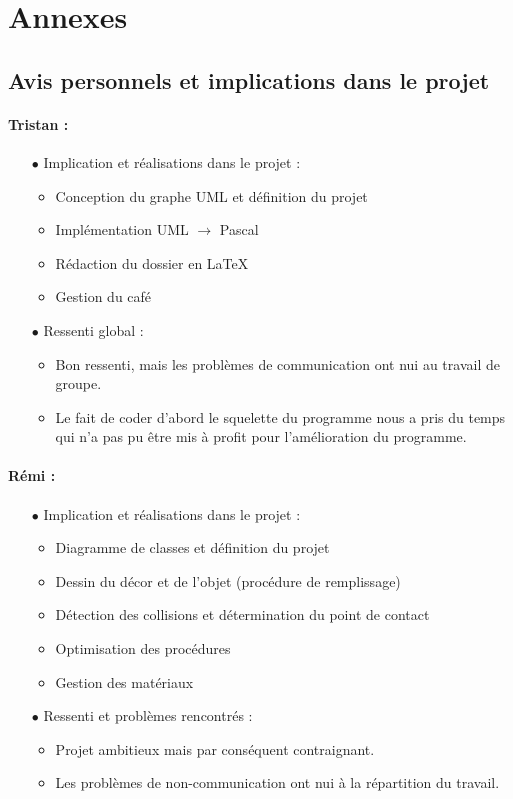 \section{Annexes}
\subsection{Avis personnels et implications dans le projet}
\paragraph{Tristan :}
\begin{itemize}

\item[$\bullet$]  Implication et réalisations dans le projet :
\begin{itemize}
\item Conception du graphe UML et définition du projet
\item Implémentation UML $\rightarrow$ Pascal
\item Rédaction du dossier en \LaTeX
\item Gestion du café
\end{itemize}
\item[$\bullet$] Ressenti global :
\begin{itemize}
\item Bon ressenti, mais les problèmes de communication ont nui au travail de groupe.
\item Le fait de coder d'abord le squelette du programme nous a pris du temps
qui n'a pas pu être mis à profit pour l'amélioration du programme.
\end{itemize}

\end{itemize}
\paragraph{Rémi :}
\begin{itemize}
\item[$\bullet$]  Implication et réalisations dans le projet :
\begin{itemize}
\item Diagramme de classes et définition du projet
\item Dessin du décor et de l'objet (procédure de remplissage)
\item Détection des collisions et détermination du point de contact
\item Optimisation des procédures
\item Gestion des matériaux 
\end{itemize}
\item[$\bullet$] Ressenti et problèmes rencontrés :
\begin{itemize}
\item Projet ambitieux mais par conséquent contraignant.
\item Les problèmes de non-communication ont nui à la répartition du travail.
\end{itemize}
\end{itemize}

